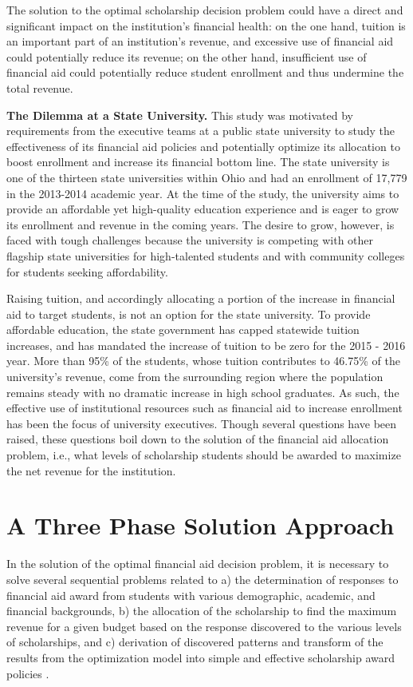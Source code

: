 \documentclass[12pt,english]{report}
\begin{document}
The solution to the optimal scholarship decision problem could have a direct 
and significant impact on the institution's financial health: on the one hand, 
tuition is an important part of an institution's revenue, and excessive use of 
financial aid could potentially reduce its revenue; on the other hand, 
insufficient use of financial aid could potentially reduce student enrollment 
and thus undermine the total revenue. 

\vspace*{.15in} 
\noindent \textbf{The Dilemma at a State University.} This study was  
motivated by requirements from the executive teams at a public state  
university to study the effectiveness of its financial aid policies  and 
potentially optimize its allocation to boost enrollment and  increase its 
financial bottom line.   The state university is one of the thirteen state 
universities  within Ohio and had an enrollment of 17,779  in the 2013-2014 
academic year. At the time of the study, the university aims to provide an 
affordable yet high-quality education experience and is eager to grow its 
enrollment and revenue in the  coming years.  The desire to grow, however, is 
faced with tough challenges because the university is competing with other 
flagship state universities for high-talented students and with community colleges 
for students seeking affordability.

Raising tuition, and accordingly allocating a portion of the increase in 
financial aid to target students, is not an option for the state university. 
To provide affordable education, the state government has capped statewide 
tuition increases, and has mandated the increase of tuition to be zero for the 
2015 - 2016 year. More than 95\% of the students, whose tuition contributes to 
46.75\% of the university's revenue, come from the surrounding region where 
the population remains steady with no dramatic increase in high school 
graduates. As such, the effective use of institutional resources such as 
financial aid to increase enrollment has been the focus of university 
executives. Though several questions have been raised, these questions boil 
down to the solution of the financial aid allocation problem, i.e., what 
levels of scholarship students should be awarded to maximize the net revenue 
for the institution.

\section{A Three Phase Solution Approach}
In the solution of the optimal financial aid decision problem,  it is 
necessary to solve several sequential problems related to a) the determination 
of responses to financial aid award from students with various demographic, 
academic, and financial backgrounds, b) the allocation of the 
scholarship to find the maximum revenue for a given budget based on the 
response discovered to the various levels of scholarships, and c) derivation 
of discovered patterns and transform of the results from the optimization 
model into simple and effective scholarship award policies .
\end{document}
